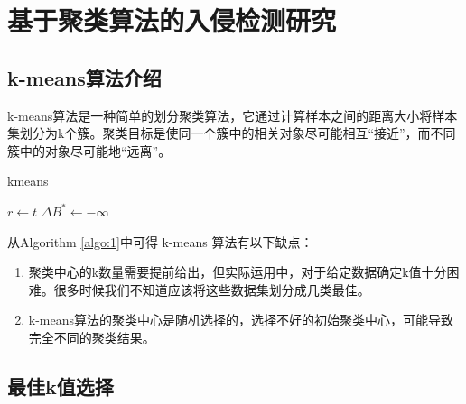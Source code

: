 \section{基于聚类算法的入侵检测研究}

\subsection{k-means算法介绍}
k-means算法是一种简单的划分聚类算法，它通过计算样本之间的距离大小将样本集划分为k个簇。聚类目标是使同一个簇中的相关对象尽可能相互“接近”，而不同簇中的对象尽可能地“远离”。

\IncMargin{1em} %
\begin{algorithm} 
	\caption{kmeans}
	\label{algo:1} 
	$r\leftarrow t$\; $\Delta B^{\ast}\leftarrow -\infty$\;  
\end{algorithm}
\DecMargin{1em}

从Algorithm \ref{algo:1}中可得 k-means 算法有以下缺点：
\begin{enumerate}  
	\item 聚类中心的k数量需要提前给出，但实际运用中，对于给定数据确定k值十分困难。很多时候我们不知道应该将这些数据集划分成几类最佳。
	\item k-means算法的聚类中心是随机选择的，选择不好的初始聚类中心，可能导致完全不同的聚类结果。
\end{enumerate}
\subsection{最佳k值选择}


\setcounter{table}{0}
\setcounter{figure}{0}
\setcounter{equation}{0}